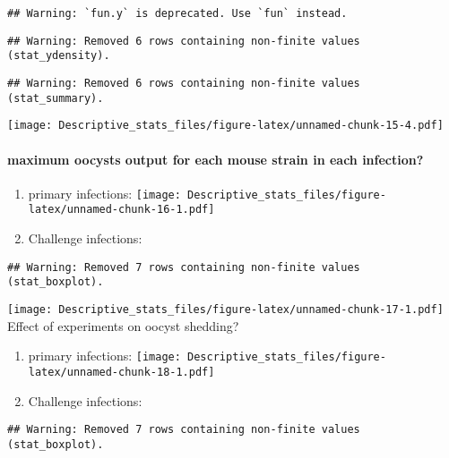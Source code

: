 \documentclass[
]{article}
\begin{document}
\begin{verbatim}
## Warning: `fun.y` is deprecated. Use `fun` instead.
\end{verbatim}

\begin{verbatim}
## Warning: Removed 6 rows containing non-finite values (stat_ydensity).
\end{verbatim}

\begin{verbatim}
## Warning: Removed 6 rows containing non-finite values (stat_summary).
\end{verbatim}

\texttt{[image: Descriptive\_stats\_files/figure-latex/unnamed-chunk-15-4.pdf]}

\hypertarget{maximum-oocysts-output-for-each-mouse-strain-in-each-infection}{%
\paragraph{maximum oocysts output for each mouse strain in each
infection?}\label{maximum-oocysts-output-for-each-mouse-strain-in-each-infection}}

\begin{enumerate}
\def\labelenumi{\arabic{enumi}.}
\item
  primary infections:
  \texttt{[image: Descriptive\_stats\_files/figure-latex/unnamed-chunk-16-1.pdf]}
\item
  Challenge infections:
\end{enumerate}

\begin{verbatim}
## Warning: Removed 7 rows containing non-finite values (stat_boxplot).
\end{verbatim}

\texttt{[image: Descriptive\_stats\_files/figure-latex/unnamed-chunk-17-1.pdf]}
Effect of experiments on oocyst shedding?

\begin{enumerate}
\def\labelenumi{\arabic{enumi}.}
\item
  primary infections:
  \texttt{[image: Descriptive\_stats\_files/figure-latex/unnamed-chunk-18-1.pdf]}
\item
  Challenge infections:
\end{enumerate}

\begin{verbatim}
## Warning: Removed 7 rows containing non-finite values (stat_boxplot).
\end{verbatim}
\end{document}
